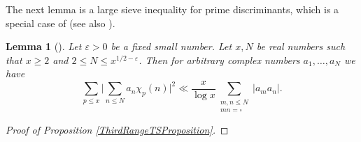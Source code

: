 \documentclass[JEP,XML,SOM,Unicode,NoFloatCountersInSection,published]{cedram}
\theoremstyle{plain}
\newtheorem{lem}[thm]{Lemma}
\theoremstyle{definition}
\let\ep\varepsilon
\begin{document}
The next lemma is a large sieve inequality for prime discriminants, which is a special case of \cite[Lem.\,9]{MoVa79} (see also \cite[Lem.\,1]{BaMo}).

\begin{lem} [{\cite[Lem.\,9]{MoVa79}}]\label{LargeSieveMV}
Let $\ep>0$ be a fixed small number. Let $x, N$ be real numbers such that $x\geq 2$ and $2\leq N\leq x^{1/2-\ep}$. Then for arbitrary complex numbers $a_1, \dots, a_N$ we have\vspace*{-3pt}
\[
\sum_{p\le x} \biggl|\sum_{n\leq N} a_n \chi_p(n)\biggr|^2 \ll \frac{x}{\log x} \sum_{\substack{m, n \leq N\\ mn= \square}} |a_ma_n|.
\]
\end{lem}

\begin{proof}[Proof of Proposition \ref{ThirdRangeTSProposition}]


\end{proof}
\end{document}
